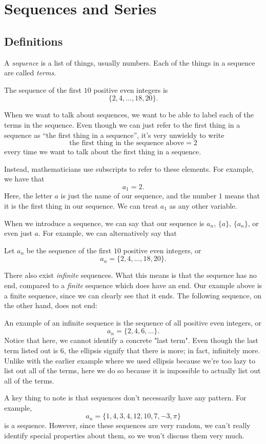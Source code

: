 \chapter{Sequences and Series}
\section{Definitions}
\begin{definition}
    A \emph{sequence} is a list of things, usually numbers. Each of the things in a sequence are called \emph{terms}.
\end{definition}
\begin{example}
    The sequence of the first $10$ positive even integers is
    \[\{2,4,\dots,18,20\}.\]
\end{example}
When we want to talk about sequences, we want to be able to label each of the terms in the sequence. Even though we can just refer to the first thing in a sequence as ``the first thing in a sequence'', it's very unwieldy to write
\[\text{the first thing in the sequence above}=2\]
every time we want to talk about the first thing in a sequence.

Instead, mathematicians use subscripts to refer to these elements. For example, we have that
\[a_1=2.\]
Here, the letter $a$ is just the name of our sequence, and the number $1$ means that it is the first thing in our sequence. We can treat $a_1$ as any other variable.

When we introduce a sequence, we can say that our sequence is $a_n$, $\{a\}$, $\{a_n\}$, or even just $a$. For example, we can alternatively say that
\begin{example}
    Let $a_n$ be the sequence of the first $10$ positive even integers, or
    \[a_n=\{2,4,\dots,18,20\}.\]
\end{example}
There also exist \emph{infinite} sequences. What this means is that the sequence has no end, compared to a \emph{finite} sequence which does have an end. Our example above is a finite sequence, since we can clearly see that it ends. The following sequence, on the other hand, does not end:
\begin{example}
    An example of an infinite sequence is the sequence of all positive even integers, or
    \[a_n=\{2,4,6,\dots\}.\]
    Notice that here, we cannot identify a concrete "last term". Even though the last term listed out is $6$, the ellipsis signify that there is more; in fact, infinitely more. Unlike with the earlier example where we used ellipsis because we're too lazy to list out all of the terms, here we do so because it is impossible to actually list out all of the terms.
\end{example}
A key thing to note is that sequences don't necessarily have any pattern. For example,
\[a_n=\{1,4,3,4,12,10,7,-3,\pi\}\] 
is a sequence. However, since these sequences are very random, we can't really identify special properties about them, so we won't discuss them very much.

